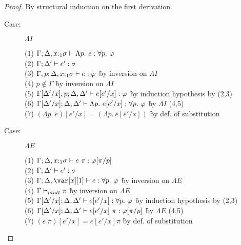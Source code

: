 \LinearSubstitutionLemma



\begin{proof}
By structural induction on the first derivation.

\begin{description}

\item[Case:] $\Lambda I$
\begin{tabbing}
  (1) $\Gamma; \Delta, x{:}_1\sigma \vdash \Lambda p.~e : \forall p.~\varphi$\\
  (2) $\Gamma; \Delta' \vdash e' : \sigma$\\
  (3) $\Gamma, p; \Delta,x{:}_1\sigma \vdash e : \varphi$ \` by inversion on $\Lambda I$\\
  (4) $p \notin \Gamma$ \` by inversion on $\Lambda I$\\
  (5) $\Gamma[\Delta'/x],p; \Delta,\Delta' \vdash e[e'/x] : \varphi$ \` by induction hypothesis by (2,3)\\
  (6) $\Gamma[\Delta'/x];\Delta,\Delta' \vdash \Lambda p.~e[e'/x] : \forall p.~\varphi$ \` by $\Lambda I$ (4,5)\\
  (7) $(\Lambda p.~e)[e'/x] = (\Lambda p.~e[e'/x])$ \` by def. of substitution\\
\end{tabbing}

\item[Case:] $\Lambda E$
\begin{tabbing}
  (1) $\Gamma; \Delta, x{:}_1\sigma \vdash e~\pi: \varphi[\pi/p]$\\
  (2) $\Gamma; \Delta' \vdash e' : \sigma$\\
  (3) $\G; \D, \xl \vdash e : \forall p.~\varphi$ \` by inversion on $\Lambda E$\\
  (4) $\Gamma \vdash_{mult} \pi$ \` by inversion on $\Lambda E$\\
  (5) $\Gamma[\Delta'/x]; \Delta,\Delta' \vdash e[e'/x] : \forall p.~\varphi$ \` by induction hypothesis by (2,3)\\
  (6) $\Gamma[\Delta'/x]; \Delta,\Delta' \vdash e[e'/x]~\pi : \varphi[\pi/p]$ \` by $\Lambda E$ (4,5)\\
  (7) $(e~\pi)[e'/x] = e[e'/x] \pi$ \` by def. of substitution\\
\end{tabbing}


\end{description}
\end{proof}
